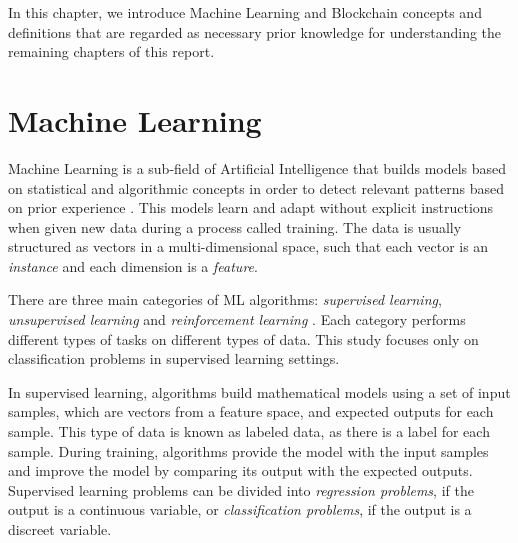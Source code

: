 In this chapter, we introduce Machine Learning and Blockchain concepts and definitions that are regarded as necessary prior knowledge for understanding the remaining chapters of this report.

\section{Machine Learning}\label{fundamentals:machine_learning}

Machine Learning is a sub-field of Artificial Intelligence that builds models based on statistical and algorithmic concepts in order to detect relevant patterns based on prior experience \cite{geron_2019}. This models learn and adapt without explicit instructions when given new data during a process called training. The data is usually structured as vectors in a multi-dimensional space, such that each vector is an \textit{instance} and each dimension is a \textit{feature}.

There are three main categories of ML algorithms: \textit{supervised learning}, \textit{unsupervised learning} and \textit{reinforcement learning} \cite{geron_2019}. Each category performs different types of tasks on different types of data. This study focuses only on classification problems in supervised learning settings.

In supervised learning, algorithms build mathematical models using a set of input samples, which are vectors from a feature space, and expected outputs for each sample. This type of data is known as labeled data, as there is a label for each sample. During training, algorithms provide the model with the input samples and improve the model by comparing its output with the expected outputs. Supervised learning problems can be divided into \textit{regression problems}, if the output is a continuous variable, or \textit{classification problems}, if the output is a discreet variable.



